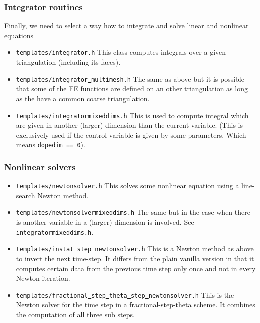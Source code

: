\documentclass[prodmode,acmtoms]{acmsmall}
\numberwithin{equation}{section}
\begin{document}
\subsubsection{Integrator routines}
Finally, we need to select a way how to integrate and solve linear and nonlinear equations
\begin{itemize}
\item \texttt{templates/integrator.h} This class computes integrals over a given 
  triangulation (including its faces).
\item \texttt{templates/integrator\underline{ }multimesh.h} The same as above but it is 
  possible that some of the FE functions are defined on an other triangulation 
  as long as the have a common coarse triangulation.
\item \texttt{templates/integratormixeddims.h} This is used to compute integral which 
  are given in another (larger) dimension than the current variable. (This is exclusively
  used if the control variable is given by some parameters. Which means \texttt{dopedim == 0}). 
\end{itemize}

\subsubsection{Nonlinear solvers}
\begin{itemize}
\item \texttt{templates/newtonsolver.h} This solves some nonlinear equation using a 
  line-search Newton method.
\item \texttt{templates/newtonsolvermixeddims.h} The same but in the case when there is 
  another variable in a (larger) dimension is involved. See 
  \texttt{integratormixeddims.h}.
\item \texttt{templates/instat\underline{ }step\underline{ }newtonsolver.h} This is a 
  Newton method as above to invert the next time-step. It differs from the plain vanilla
  version in that it computes certain data from the previous time step only once 
  and not in every Newton iteration.
\item \texttt{templates/fractional\underline{ }step\underline{ }theta\underline{ }step\underline{ }newtonsolver.h} This is the Newton solver for the time step in a 
  fractional-step-theta scheme. It combines the computation of all three sub steps.
\end{itemize}
\end{document}
